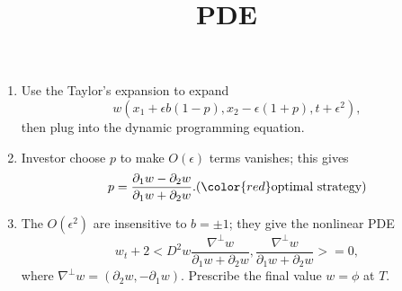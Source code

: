 \documentclass{beamer}
\begin{document}
\begin{frame}
\title{PDE}
\begin{enumerate}
	\item Use the Taylor's expansion to expand
	$$w(x_1+\epsilon b(1-p),x_2-\epsilon(1+p),t+\epsilon^2),$$
	then plug into the dynamic programming equation.
	\item Investor choose $p$ to make $O(\epsilon)$ terms vanishes; this gives 
	$$p = \frac{\partial_1 w - \partial_2 w}{\partial_1 w + \partial_2 w}. ({\color{red}\text{optimal strategy}})$$ 
	\item The $O(\epsilon^2)$ are insensitive to $b = \pm 1$; they give the nonlinear PDE
	$$w_t + 2<D^2 w \frac{\nabla^\perp w}{\partial_1 w + \partial_2 w},\frac{\nabla^\perp w}{\partial_1 w+\partial_2 w}> = 0,$$
	where $\nabla^\perp w = (\partial_2 w,-\partial_1 w).$ Prescribe the final value $w = \phi$ at $T$.
\end{enumerate}
\end{frame}

%
\end{document}
